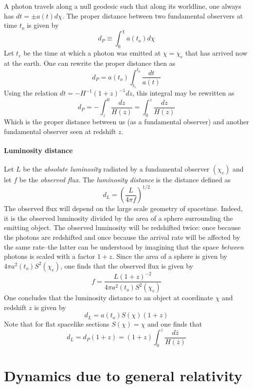 \documentclass[10pt]{article}
\begin{document}
A photon travels along a null geodesic such that along its 
worldline, one always has $dt = \pm a(t)d\chi$. The proper 
distance between two fundamental observers at time $t_o$ is given 
by
\begin{equation}
	d_P \equiv \int_{0}^{\chi} a(t_o) d\chi
\end{equation}
%
Let $t_e$ be the time at which a photon was emitted at $\chi = 
\chi_e$ that has arrived now at the earth. One can rewrite the 
proper distance then as
%
\begin{equation}
	d_P = a(t_o) \int_{t_e}^{t_o} \frac{dt}{a(t)}
\end{equation}
%
Using the relation $dt = -H^{-1}(1+z)^{-1}dz$, this integral may 
be rewritten as
%
\begin{equation}
	d_P = - \int_{z}^0 \frac{dz}{H(z)} = \int_0^z \frac{dz}{H(z)}
\end{equation}
%
Which is the proper distance between us (as a fundamental 
observer) and another fundamental observer seen at redshift $z$.

\paragraph{Luminosity distance}

Let $L$ be the \emph{absolute luminosity} radiated by a 
fundamental observer $(\chi_e)$ and let $f$ be the \emph{observed 
	flux}. The \emph{luminosity distance} is the distance defined 
as
%
\begin{equation}
	d_L = \left( \frac{L}{4\pi f} \right)^{1/2}
\end{equation}
%
The observed flux will depend on the large scale geometry of 
spacetime.  Indeed, it is the observed luminosity divided by the 
area of a sphere surrounding the emitting object. The observed 
luminosity will be redshifted twice: once because the photons are 
redshifted and once because the arrival rate will be affected by 
the same rate--the latter can be understood by imagining that the 
space \emph{between} photons is scaled with a factor $1+z$. Since 
the area of a sphere is given by $4\pi a^2(t_o)S^2(\chi_e)$, one 
finds that the observed flux is given by
%
\begin{displaymath}
	f = \frac{L(1+z)^{-2}}{4 \pi a^2(t_o)S^2(\chi_e)}
\end{displaymath}
%
One concludes that the luminosity distance to an object at 
coordinate $\chi$ and redshift $z$ is given by
%
\begin{equation}
	d_L = a(t_o)S(\chi)(1+z)
\end{equation}
%
Note that for flat spacelike sections $S(\chi) = \chi$ and one 
finds
that
%
\begin{displaymath}
	d_L = d_P (1+z) = (1+z)\int_0^z \frac{d\bar{z}}{H(\bar{z})}
\end{displaymath}

\section{Dynamics due to general relativity}

%
%
\end{document}
